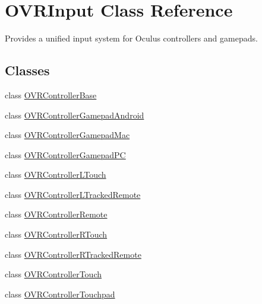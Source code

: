 \hypertarget{class_o_v_r_input}{}\section{O\+V\+R\+Input Class Reference}
\label{class_o_v_r_input}


Provides a unified input system for Oculus controllers and gamepads.  


\subsection*{Classes}
\begin{DoxyCompactItemize}
\item 
class \mbox{\hyperlink{class_o_v_r_input_1_1_o_v_r_controller_base}{O\+V\+R\+Controller\+Base}}
\item 
class \mbox{\hyperlink{class_o_v_r_input_1_1_o_v_r_controller_gamepad_android}{O\+V\+R\+Controller\+Gamepad\+Android}}
\item 
class \mbox{\hyperlink{class_o_v_r_input_1_1_o_v_r_controller_gamepad_mac}{O\+V\+R\+Controller\+Gamepad\+Mac}}
\item 
class \mbox{\hyperlink{class_o_v_r_input_1_1_o_v_r_controller_gamepad_p_c}{O\+V\+R\+Controller\+Gamepad\+PC}}
\item 
class \mbox{\hyperlink{class_o_v_r_input_1_1_o_v_r_controller_l_touch}{O\+V\+R\+Controller\+L\+Touch}}
\item 
class \mbox{\hyperlink{class_o_v_r_input_1_1_o_v_r_controller_l_tracked_remote}{O\+V\+R\+Controller\+L\+Tracked\+Remote}}
\item 
class \mbox{\hyperlink{class_o_v_r_input_1_1_o_v_r_controller_remote}{O\+V\+R\+Controller\+Remote}}
\item 
class \mbox{\hyperlink{class_o_v_r_input_1_1_o_v_r_controller_r_touch}{O\+V\+R\+Controller\+R\+Touch}}
\item 
class \mbox{\hyperlink{class_o_v_r_input_1_1_o_v_r_controller_r_tracked_remote}{O\+V\+R\+Controller\+R\+Tracked\+Remote}}
\item 
class \mbox{\hyperlink{class_o_v_r_input_1_1_o_v_r_controller_touch}{O\+V\+R\+Controller\+Touch}}
\item 
class \mbox{\hyperlink{class_o_v_r_input_1_1_o_v_r_controller_touchpad}{O\+V\+R\+Controller\+Touchpad}}
\end{DoxyCompactItemize}
